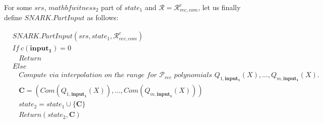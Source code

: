 \noindent For some $\mathit{srs}$, $mathbf{witness_2}$ part of $\mathit{state_1}$ and 
$\mathcal{R} = \mathcal{R}_{\mathit{vec}, \mathit{com}}^c$, let us finally define $\mathit{SNARK.PartInput}$ as follows:

\begin{align*} 
&\mathit{SNARK.PartInput}(\mathit{srs}, \mathit{state_1},\mathcal{R}_{\mathit{vec}, \mathit{com}}^c) \\  
& \mathit{If \ }  c(\mathbf{input_1}) = 0 \\
& \ \ \ \ \mathit{Return} \\
& \mathit{Else} \\
& \ \ \ \ \textit{Compute via interpolation on the range for } \mathscr{P}_{\mathit{vec}}  \textit{ polynomials } 
\mathit{Q_{1,\mathbf{input_1}}}(X), \ldots, \mathit{Q_{m, \mathbf{input_1}}}(X).\\
& \ \ \ \ \mathbf{C} = (\mathit{Com}(Q_{1,\mathbf{input_1}}(X)), \ldots, \mathit{Com}(Q_{m,\mathbf{input_1}}(X))) \\
& \ \ \ \ \mathit{state_2} =  \mathit{state_1} \cup \{ \mathbf{C} \} \\
& \ \ \ \ \mathit{Return} (\mathit{state_2,  \mathbf{C}})
\end{align*}


